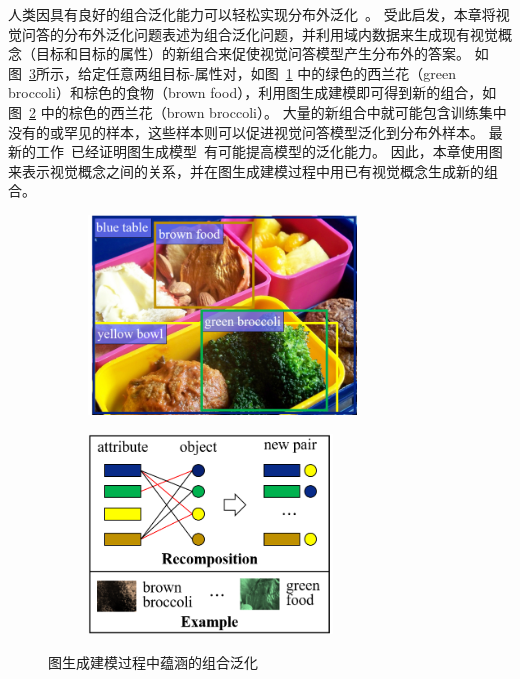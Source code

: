人类因具有良好的组合泛化能力可以轻松实现分布外泛化~\cite{lake2017building}。
受此启发，本章将视觉问答的分布外泛化问题表述为组合泛化问题，并利用域内数据来生成现有视觉概念（目标和目标的属性）的新组合来促使视觉问答模型产生分布外的答案。
如图~\ref{fig:c3_motivation}所示，给定任意两组目标-属性对，如图~\ref{fig:c3_1} 中的绿色的西兰花（green broccoli）和棕色的食物（brown food），利用图生成建模即可得到新的组合，如图~\ref{fig:c3_2} 中的棕色的西兰花（brown broccoli）。
大量的新组合中就可能包含训练集中没有的或罕见的样本，这些样本则可以促进视觉问答模型泛化到分布外样本。
最新的工作~\cite{dai2018adversarial,zheng2020distribution}已经证明图生成模型~\cite{wang2018graphgan}有可能提高模型的泛化能力。
因此，本章使用图来表示视觉概念之间的关系，并在图生成建模过程中用已有视觉概念生成新的组合。



\begin{figure}[!t]
\begin{subfigure}[b]{0.495\textwidth}
\centering
\includegraphics[height=5.3cm]{figure/c3_f1.png}
\label{fig:c3_1}
\end{subfigure}
\begin{subfigure}[b]{0.495\textwidth}
\centering
\includegraphics[height=5.3cm]{figure/c3_f2.png}
\label{fig:c3_2}
\end{subfigure}
\caption{图生成建模过程中蕴涵的组合泛化}
\label{fig:c3_motivation}
\end{figure}


